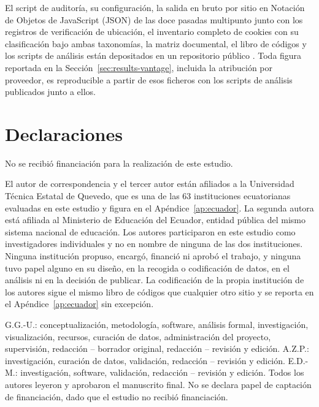 \documentclass[pdflatex,sn-basic,Numbered,iicol]{sn-jnl}
\theoremstyle{thmstyleone}
\theoremstyle{thmstyletwo}
\theoremstyle{thmstylethree}
\begin{document}
El script de auditor\'ia, su configuraci\'on, la salida en bruto por sitio en Notaci\'on de Objetos de JavaScript (JSON) de las doce pasadas multipunto junto con los registros de verificaci\'on de ubicaci\'on, el inventario completo de cookies con su clasificaci\'on bajo ambas taxonom\'ias, la matriz documental, el libro de c\'odigos y los scripts de an\'alisis est\'an depositados en un repositorio p\'ublico \citep{deposito2026}. Toda figura reportada en la Secci\'on~\ref{sec:results-vantage}, incluida la atribuci\'on por proveedor, es reproducible a partir de esos ficheros con los scripts de an\'alisis publicados junto a ellos.

\section*{Declaraciones}


No se recibi\'o financiaci\'on para la realizaci\'on de este estudio.


El autor de correspondencia y el tercer autor est\'an afiliados a la Universidad T\'ecnica Estatal de Quevedo, que es una de las 63 instituciones ecuatorianas evaluadas en este estudio y figura en el Ap\'endice~\ref{ap:ecuador}. La segunda autora est\'a afiliada al Ministerio de Educaci\'on del Ecuador, entidad p\'ublica del mismo sistema nacional de educaci\'on. Los autores participaron en este estudio como investigadores individuales y no en nombre de ninguna de las dos instituciones. Ninguna instituci\'on propuso, encarg\'o, financi\'o ni aprob\'o el trabajo, y ninguna tuvo papel alguno en su dise\~no, en la recogida o codificaci\'on de datos, en el an\'alisis ni en la decisi\'on de publicar. La codificaci\'on de la propia instituci\'on de los autores sigue el mismo libro de c\'odigos que cualquier otro sitio y se reporta en el Ap\'endice~\ref{ap:ecuador} sin excepci\'on.


G.G.-U.: conceptualizaci\'on, metodolog\'ia, software, an\'alisis formal, investigaci\'on, visualizaci\'on, recursos, curaci\'on de datos, administraci\'on del proyecto, supervisi\'on, redacci\'on -- borrador original, redacci\'on -- revisi\'on y edici\'on. A.Z.P.: investigaci\'on, curaci\'on de datos, validaci\'on, redacci\'on -- revisi\'on y edici\'on. E.D.-M.: investigaci\'on, software, validaci\'on, redacci\'on -- revisi\'on y edici\'on. Todos los autores leyeron y aprobaron el manuscrito final. No se declara papel de captaci\'on de financiaci\'on, dado que el estudio no recibi\'o financiaci\'on.
\end{document}
